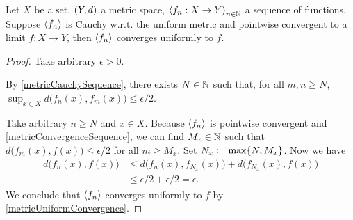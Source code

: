 \begin{lemma} \label{uniformCauchyPointwiseConvergentUniformConvergent}
Let $X$ be a set, $\sSet{Y,d}$ a metric space, $\left\langle f_n:X\to Y \right\rangle_{n\in \mathbb{N}}$ a sequence of functions. Suppose $\left\langle f_n \right\rangle$ is Cauchy w.r.t. the uniform metric and pointwise convergent to a limit $f: X\to Y$, then $\left\langle f_n \right\rangle$ converges uniformly to $f$.
\end{lemma}
\begin{proof}
Take arbitrary $\epsilon >0$.

By \ref{metricCauchySequence}, there exists $N\in \mathbb{N}$ such that, for all $m,n \geq N$, $\sup_{x\in X} d\big(f_n(x), f_m(x)\big) \leq \epsilon / 2$.

Take arbitrary $n \geq N$ and $x\in X$. Because $\left\langle f_n \right\rangle$ is pointwise convergent and \ref{metricConvergenceSequence}, we can find $M_x \in \mathbb{N}$ such that $d\big(f_{m}(x), f(x)\big) \leq \epsilon / 2$ for all $m \geq M_x$. Set $N_x \coloneqq \max\{N, M_x\}$.
Now we have
\begin{align*}
d\big(f_n(x), f(x)\big) &\leq d\big(f_n(x), f_{N_x}(x)\big) + d\big(f_{N_x}(x), f(x)\big) \\
&\leq \epsilon /2 + \epsilon / 2 = \epsilon.
\end{align*}
We conclude that $\left\langle f_n \right\rangle$ converges uniformly to $f$ by \ref{metricUniformConvergence}.
\end{proof}

